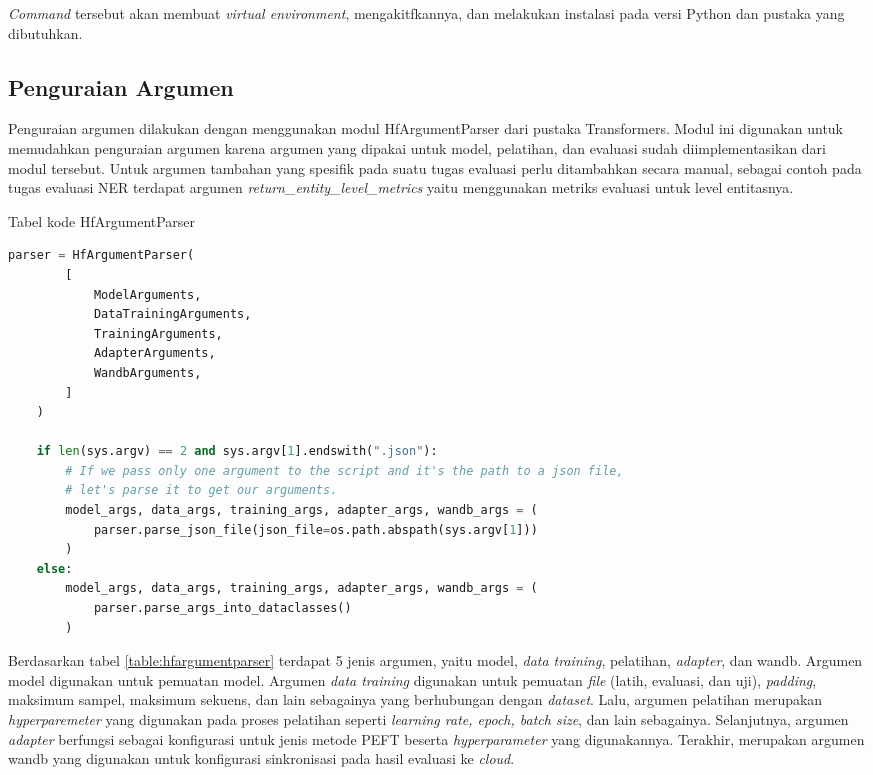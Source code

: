 \textit{Command} tersebut akan membuat \textit{virtual environment}, mengakitfkannya, dan melakukan instalasi pada versi Python dan pustaka yang dibutuhkan.

\subsection{Penguraian Argumen}
\label{sec:parse-arg}

Penguraian argumen dilakukan dengan menggunakan modul HfArgumentParser dari pustaka Transformers. Modul ini digunakan untuk memudahkan penguraian argumen karena argumen yang dipakai untuk model, pelatihan, dan evaluasi sudah diimplementasikan dari modul tersebut. Untuk argumen tambahan yang spesifik pada suatu tugas evaluasi perlu ditambahkan secara manual, sebagai contoh pada tugas evaluasi NER terdapat argumen \textit{return\_entity\_level\_metrics} yaitu menggunakan metriks evaluasi untuk level entitasnya.

\begin{table}[h]
    \caption{Tabel kode HfArgumentParser}
    \label{table:hfargumentparser}
    \begin{lstlisting}[language=python]
    parser = HfArgumentParser(
        [
            ModelArguments,
            DataTrainingArguments,
            TrainingArguments,
            AdapterArguments,
            WandbArguments,
        ]
    )

    if len(sys.argv) == 2 and sys.argv[1].endswith(".json"):
        # If we pass only one argument to the script and it's the path to a json file,
        # let's parse it to get our arguments.
        model_args, data_args, training_args, adapter_args, wandb_args = (
            parser.parse_json_file(json_file=os.path.abspath(sys.argv[1]))
        )
    else:
        model_args, data_args, training_args, adapter_args, wandb_args = (
            parser.parse_args_into_dataclasses()
        )
    \end{lstlisting}
\end{table}

Berdasarkan tabel \ref{table:hfargumentparser} terdapat 5 jenis argumen, yaitu model, \textit{data training}, pelatihan, \textit{adapter}, dan wandb. Argumen model digunakan untuk pemuatan model. Argumen \textit{data training} digunakan untuk pemuatan \textit{file} (latih, evaluasi, dan uji), \textit{padding}, maksimum sampel, maksimum sekuens, dan lain sebagainya yang berhubungan dengan \textit{dataset}. Lalu, argumen pelatihan merupakan \textit{hyperparemeter} yang digunakan pada proses pelatihan seperti \textit{learning rate, epoch, batch size}, dan lain sebagainya. Selanjutnya, argumen \textit{adapter} berfungsi sebagai konfigurasi untuk jenis metode PEFT beserta \textit{hyperparameter} yang digunakannya. Terakhir, merupakan argumen wandb yang digunakan untuk konfigurasi sinkronisasi pada hasil evaluasi ke \textit{cloud}.

